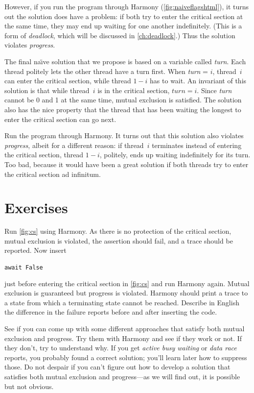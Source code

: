 \documentclass{report}
\newenvironment{code}{
\tcolorbox
}{
\endtcolorbox
}
\begin{document}
However, if you run the program through Harmony (\autoref{fig:naiveflagshtml}),
it turns out the solution
does have a problem: if both try to enter the critical section at the same
time, they may end up waiting for one another indefinitely.
(This is a form of \emph{deadlock}, which will be discussed in
\autoref{ch:deadlock}.)
Thus the
solution violates \emph{progress}.

The final na\"{\i}ve solution that we propose
is based on a variable called \textit{turn}.
Each thread politely lets the other thread have a turn first.
When \textit{turn} = $i$, thread~$i$ can
enter the critical section, while thread $1-i$ has to wait.
An invariant of this solution is that while thread~$i$ is in the critical
section, $\mathit{turn} = i$.
Since \textit{turn} cannot be 0 and 1 at
the same time, mutual exclusion is satisfied.
The solution also has the nice property that the thread that has been waiting the
longest to enter the critical section can go next.

Run the program through Harmony.  It turns out that this solution also violates
\emph{progress}, albeit for a different reason:
if thread~$i$ terminates instead of entering the critical section,
thread $1-i$, politely, ends up waiting indefinitely for its turn.
Too bad, because it would have been a great solution if both
threads try to enter the critical section ad infinitum.

\section*{Exercises}
\begin{problems}
\item Run \autoref{fig:cs} using Harmony.  As there is no protection of the critical
section, mutual exclusion is violated,
the assertion should fail, and a trace should be reported.
Now insert
\begin{code}
\texttt{await False}
\end{code}
just before entering the critical section
in \autoref{fig:cs} and run Harmony again.
Mutual exclusion is guaranteed but progress is violated.
Harmony should print a trace
to a state from which a terminating state cannot be reached.
Describe in English the difference in the failure reports before
and after inserting the code.
\item See if you can come up with some different approaches that satisfy both
mutual exclusion and progress.  Try them with Harmony and see if they work or not.
If they don't, try to understand why.
If you get \emph{active busy waiting} or \emph{data race} reports, you probably
found a correct solution; you'll learn later how to suppress those.
Do not despair if you can't figure out how to develop a solution that satisfies both
mutual exclusion and progress---as we will find out, it is possible but not obvious.
\end{problems}
\end{document}
